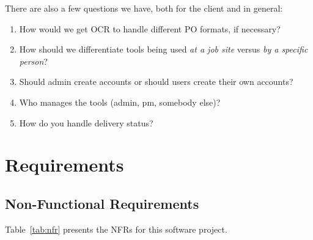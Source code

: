 \documentclass{article}
\begin{document}
There are also a few questions we have, both for the client and in general:
\begin{enumerate}
    \item How would we get OCR to handle different PO formats, if necessary?
    \item How should we differentiate tools being used \textit{at a job site} versus \textit{by a specific person}?
    \item Should admin create accounts or should users create their own accounts?
    \item Who manages the tools (admin, pm, somebody else)?
    \item How do you handle delivery status?
\end{enumerate}




\section{Requirements}

\subsection{Non-Functional Requirements}

Table~\ref{tab:nfr} presents the NFRs for this software project.
\end{document}
